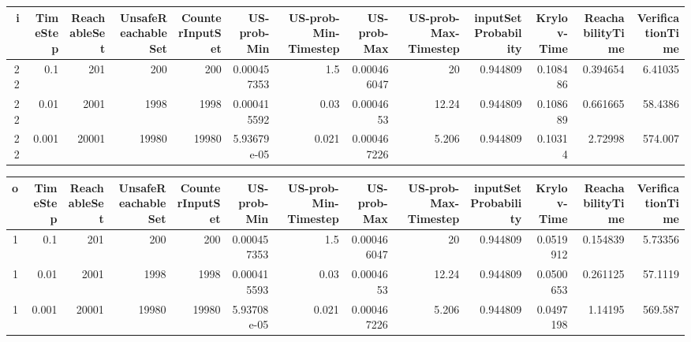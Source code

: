 \begin{tabular}{rrrrrrrrrrrrr}
\hline
   i &   TimeStep &   ReachableSet &   UnsafeReachableSet &   CounterInputSet &   US-prob-Min &   US-prob-Min-Timestep &   US-prob-Max &   US-prob-Max-Timestep &   inputSet Probability &   Krylov-Time &   ReachabilityTime &   VerificationTime \\
\hline
  22 &      0.1   &            201 &                  200 &               200 &   0.000457353 &                  1.5   &   0.000466047 &                 20     &               0.944809 &      0.108486 &           0.394654 &            6.41035 \\
  22 &      0.01  &           2001 &                 1998 &              1998 &   0.000415592 &                  0.03  &   0.0004653   &                 12.24  &               0.944809 &      0.108689 &           0.661665 &           58.4386  \\
  22 &      0.001 &          20001 &                19980 &             19980 &   5.93679e-05 &                  0.021 &   0.000467226 &                  5.206 &               0.944809 &      0.10314  &           2.72998  &          574.007   \\
\hline
\end{tabular}
\begin{tabular}{rrrrrrrrrrrrr}
\hline
   o &   TimeStep &   ReachableSet &   UnsafeReachableSet &   CounterInputSet &   US-prob-Min &   US-prob-Min-Timestep &   US-prob-Max &   US-prob-Max-Timestep &   inputSet Probability &   Krylov-Time &   ReachabilityTime &   VerificationTime \\
\hline
   1 &      0.1   &            201 &                  200 &               200 &   0.000457353 &                  1.5   &   0.000466047 &                 20     &               0.944809 &     0.0519912 &           0.154839 &            5.73356 \\
   1 &      0.01  &           2001 &                 1998 &              1998 &   0.000415593 &                  0.03  &   0.0004653   &                 12.24  &               0.944809 &     0.0500653 &           0.261125 &           57.1119  \\
   1 &      0.001 &          20001 &                19980 &             19980 &   5.93708e-05 &                  0.021 &   0.000467226 &                  5.206 &               0.944809 &     0.0497198 &           1.14195  &          569.587   \\
\hline
\end{tabular}


